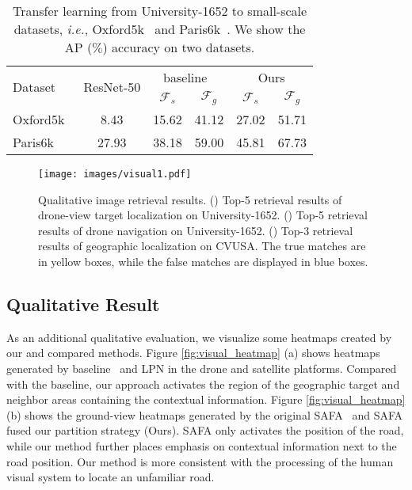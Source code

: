 \documentclass[journal]{IEEEtran}
\def\ie{\emph{i.e.}}
\begin{document}
\setlength{\tabcolsep}{6pt}
\begin{table}
\small
\caption{Transfer learning from University-1652 to small-scale datasets, \ie, Oxford5k~\cite{philbin2007object} and Paris6k~\cite{philbin2008lost}. We show the AP ($\%$) accuracy on two datasets.
}
\begin{center}
\begin{tabular}{l|c|cc|cc}
\hline
\multirow{2}{*}{Dataset} & \multirow{2}{*}{ResNet-50} & \multicolumn{2}{c|}{baseline~\cite{zheng_university-1652_nodate}} & \multicolumn{2}{c}{Ours}\\
\cline{3-6}  & & $\mathcal{F}_s$ & $\mathcal{F}_g$ & $\mathcal{F}_s$ & $\mathcal{F}_g$\\
\shline
Oxford5k~\cite{philbin2007object} & 8.43 & 15.62 & 41.12 & 27.02 & 51.71 \\  
Paris6k~\cite{philbin2008lost} & 27.93 & 38.18 & 59.00 & 45.81 & 67.73 \\ 

\hline
\end{tabular}
\end{center}
\label{table:transfer}
\end{table}

\begin{figure}[t]
  \centering
  \texttt{[image: images/visual1.pdf]}
  \caption{
  Qualitative image retrieval results. (\uppercase\expandafter{}) Top-5 retrieval results of drone-view target localization on University-1652. (\uppercase\expandafter{}) Top-5 retrieval results of drone navigation on University-1652. (\uppercase\expandafter{}) Top-3 retrieval results of geographic localization on CVUSA. The true matches are in yellow boxes, while the false matches are displayed in blue boxes.
  }
  \label{fig:visual1}
\end{figure}

\subsection{Qualitative Result} 
As an additional qualitative evaluation, we visualize some heatmaps created by our and compared methods. Figure \ref{fig:visual_heatmap} (a) shows heatmaps generated by baseline~\cite{zheng_university-1652_nodate} and LPN in the drone and satellite platforms. Compared with the baseline, our approach activates the region of the geographic target and neighbor areas containing the contextual information. Figure \ref{fig:visual_heatmap} (b) shows the ground-view heatmaps generated by the original SAFA~\cite{shi_spatial-aware_nodate} and SAFA fused our partition strategy (Ours). SAFA only activates the position of the road, while our method further places emphasis on contextual information next to the road position. Our method is more consistent with the processing of the human visual system to locate an unfamiliar road.
\end{document}
